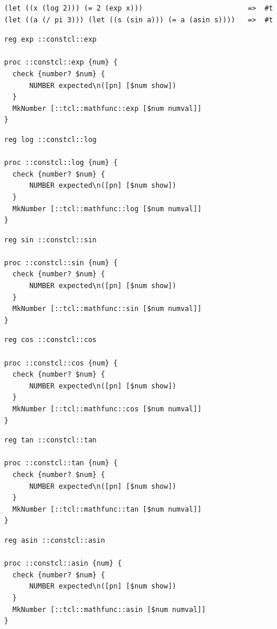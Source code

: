 \documentclass[twoside,9pt]{report}
\begin{document}
\noindent\makebox[\linewidth]{\rule{\linewidth}{0.4pt}}
\begin{lstlisting}
(let ((x (log 2))) (= 2 (exp x)))                         =>  #t
(let ((a (/ pi 3))) (let ((s (sin a))) (= a (asin s))))   =>  #t
\end{lstlisting}
\noindent\makebox[\linewidth]{\rule{\linewidth}{0.4pt}}
\noindent\makebox[\linewidth]{\rule{\linewidth}{0.4pt}}
\begin{lstlisting}
reg exp ::constcl::exp
 
proc ::constcl::exp {num} {
  check {number? $num} {
      NUMBER expected\n([pn] [$num show])
  }
  MkNumber [::tcl::mathfunc::exp [$num numval]]
}
\end{lstlisting}
\noindent\makebox[\linewidth]{\rule{\linewidth}{0.4pt}}
\noindent\makebox[\linewidth]{\rule{\linewidth}{0.4pt}}
\begin{lstlisting}
reg log ::constcl::log
 
proc ::constcl::log {num} {
  check {number? $num} {
      NUMBER expected\n([pn] [$num show])
  }
  MkNumber [::tcl::mathfunc::log [$num numval]]
}
\end{lstlisting}
\noindent\makebox[\linewidth]{\rule{\linewidth}{0.4pt}}
\noindent\makebox[\linewidth]{\rule{\linewidth}{0.4pt}}
\begin{lstlisting}
reg sin ::constcl::sin
 
proc ::constcl::sin {num} {
  check {number? $num} {
      NUMBER expected\n([pn] [$num show])
  }
  MkNumber [::tcl::mathfunc::sin [$num numval]]
}
\end{lstlisting}
\noindent\makebox[\linewidth]{\rule{\linewidth}{0.4pt}}
\noindent\makebox[\linewidth]{\rule{\linewidth}{0.4pt}}
\begin{lstlisting}
reg cos ::constcl::cos
 
proc ::constcl::cos {num} {
  check {number? $num} {
      NUMBER expected\n([pn] [$num show])
  }
  MkNumber [::tcl::mathfunc::cos [$num numval]]
}
\end{lstlisting}
\noindent\makebox[\linewidth]{\rule{\linewidth}{0.4pt}}
\noindent\makebox[\linewidth]{\rule{\linewidth}{0.4pt}}
\begin{lstlisting}
reg tan ::constcl::tan
 
proc ::constcl::tan {num} {
  check {number? $num} {
      NUMBER expected\n([pn] [$num show])
  }
  MkNumber [::tcl::mathfunc::tan [$num numval]]
}
\end{lstlisting}
\noindent\makebox[\linewidth]{\rule{\linewidth}{0.4pt}}
\noindent\makebox[\linewidth]{\rule{\linewidth}{0.4pt}}
\begin{lstlisting}
reg asin ::constcl::asin
 
proc ::constcl::asin {num} {
  check {number? $num} {
      NUMBER expected\n([pn] [$num show])
  }
  MkNumber [::tcl::mathfunc::asin [$num numval]]
}
\end{lstlisting}
\end{document}
